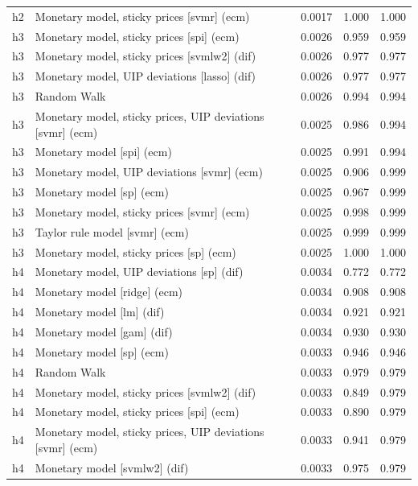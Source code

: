 \begin{ThreePartTable}
\begin{longtable}[t]{cp{5.5cm}ccc}
h2 & \raggedright Monetary model, sticky prices [svmr] (ecm) & 0.0017 & 1.000 & 1.000\\
\addlinespace
h3 & \raggedright Monetary model, sticky prices [spi] (ecm) & 0.0026 & 0.959 & 0.959\\
h3 & \raggedright Monetary model, sticky prices [svmlw2] (dif) & 0.0026 & 0.977 & 0.977\\
h3 & \raggedright Monetary model, UIP deviations [lasso] (dif) & 0.0026 & 0.977 & 0.977\\
h3 & \raggedright Random Walk & 0.0026 & 0.994 & 0.994\\
h3 & \raggedright Monetary model, sticky prices, UIP deviations [svmr] (ecm) & 0.0025 & 0.986 & 0.994\\
h3 & \raggedright Monetary model [spi] (ecm) & 0.0025 & 0.991 & 0.994\\
h3 & \raggedright Monetary model, UIP deviations [svmr] (ecm) & 0.0025 & 0.906 & 0.999\\
h3 & \raggedright Monetary model [sp] (ecm) & 0.0025 & 0.967 & 0.999\\
h3 & \raggedright Monetary model, sticky prices [svmr] (ecm) & 0.0025 & 0.998 & 0.999\\
h3 & \raggedright Taylor rule model [svmr] (ecm) & 0.0025 & 0.999 & 0.999\\
h3 & \raggedright Monetary model, sticky prices [sp] (ecm) & 0.0025 & 1.000 & 1.000\\
\addlinespace
h4 & \raggedright Monetary model, UIP deviations [sp] (dif) & 0.0034 & 0.772 & 0.772\\
h4 & \raggedright Monetary model [ridge] (ecm) & 0.0034 & 0.908 & 0.908\\
h4 & \raggedright Monetary model [lm] (dif) & 0.0034 & 0.921 & 0.921\\
h4 & \raggedright Monetary model [gam] (dif) & 0.0034 & 0.930 & 0.930\\
h4 & \raggedright Monetary model [sp] (ecm) & 0.0033 & 0.946 & 0.946\\
h4 & \raggedright Random Walk & 0.0033 & 0.979 & 0.979\\
h4 & \raggedright Monetary model, sticky prices [svmlw2] (dif) & 0.0033 & 0.849 & 0.979\\
h4 & \raggedright Monetary model, sticky prices [spi] (ecm) & 0.0033 & 0.890 & 0.979\\
h4 & \raggedright Monetary model, sticky prices, UIP deviations [svmr] (ecm) & 0.0033 & 0.941 & 0.979\\
h4 & \raggedright Monetary model [svmlw2] (dif) & 0.0033 & 0.975 & 0.979\\

\end{longtable}
\end{ThreePartTable}
